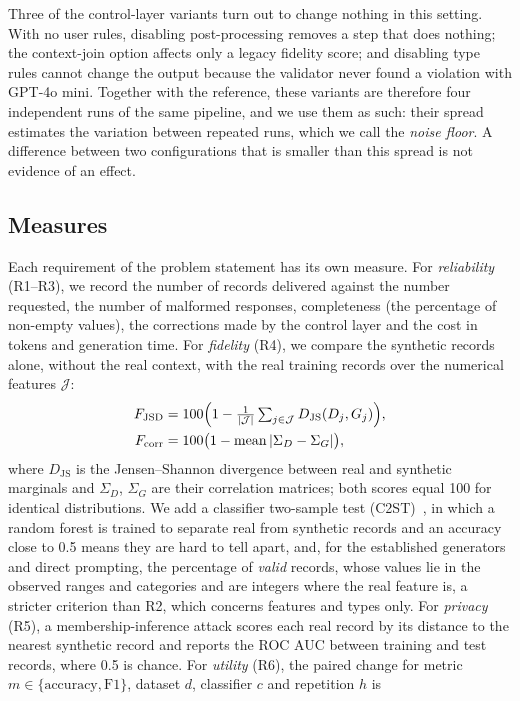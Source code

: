 \documentclass[conference]{IEEEtran}
\begin{document}
Three of the control-layer variants turn out to change nothing in this setting. With no user rules, disabling post-processing removes a step that does nothing; the context-join option affects only a legacy fidelity score; and disabling type rules cannot change the output because the validator never found a violation with GPT-4o mini. Together with the reference, these variants are therefore four independent runs of the same pipeline, and we use them as such: their spread estimates the variation between repeated runs, which we call the \emph{noise floor}. A difference between two configurations that is smaller than this spread is not evidence of an effect.

\subsection{Measures}
Each requirement of the problem statement has its own measure. For \emph{reliability} (R1--R3), we record the number of records delivered against the number requested, the number of malformed responses, completeness (the percentage of non-empty values), the corrections made by the control layer and the cost in tokens and generation time. For \emph{fidelity} (R4), we compare the synthetic records alone, without the real context, with the real training records over the numerical features $\mathcal{J}$:
\begin{equation}
\begin{aligned}
F_{\mathrm{JSD}}&=100\Bigl(1-\tfrac{1}{|\mathcal{J}|}
\textstyle\sum_{j\in\mathcal{J}}D_{\mathrm{JS}}(D_j,G_j)\Bigr),\\
F_{\mathrm{corr}}&=100\bigl(1-\operatorname{mean}|\Sigma_D-\Sigma_G|\bigr),
\end{aligned}
\label{eq:fidelity}
\end{equation}
where $D_{\mathrm{JS}}$ is the Jensen--Shannon divergence between real and synthetic marginals and $\Sigma_D$, $\Sigma_G$ are their correlation matrices; both scores equal 100 for identical distributions. We add a classifier two-sample test (C2ST)~\cite{lopezpaz2017c2st}, in which a random forest is trained to separate real from synthetic records and an accuracy close to 0.5 means they are hard to tell apart, and, for the established generators and direct prompting, the percentage of \emph{valid} records, whose values lie in the observed ranges and categories and are integers where the real feature is, a stricter criterion than R2, which concerns features and types only. For \emph{privacy} (R5), a membership-inference attack scores each real record by its distance to the nearest synthetic record and reports the ROC AUC between training and test records, where 0.5 is chance. For \emph{utility} (R6), the paired change for metric $m\in\{\mathrm{accuracy},\mathrm{F1}\}$, dataset $d$, classifier $c$ and repetition $h$ is
\end{document}
